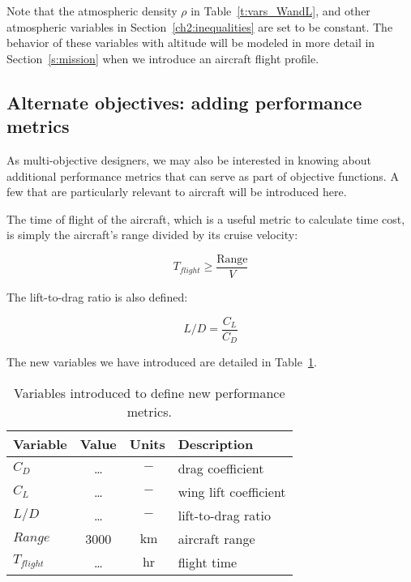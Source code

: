 Note that the atmospheric density $\rho$ in Table~\ref{t:vars_WandL}, and other
atmospheric variables in Section~\ref{ch2:inequalities} are set
to be constant. The behavior of these variables with altitude
will be modeled in more detail in Section~\ref{s:mission} when we
introduce an aircraft flight profile.

\subsection{Alternate objectives: adding performance metrics}
\label{s:altobj}

As multi-objective designers, we may also be interested in knowing about
additional performance metrics that can serve as part of objective functions. A
few that are particularly relevant to aircraft will be introduced here.

The time of flight of the aircraft, which is a useful metric to calculate
time cost, is simply the aircraft's range divided by its cruise velocity:

\begin{equation}
    T_{flight} \geq \frac{\mathrm{Range}}{V}
\end{equation}

The lift-to-drag ratio is also defined: 

\begin{equation}
    L/D = \frac{C_L}{C_D}    
\end{equation}

The new variables we have introduced are detailed in Table~\ref{t:vars_perfMetrics}.

\begin{footnotesize}
\begin{table}
    \centering
    \begin{tabular}{ l c c l}
        \toprule
        \textbf{Variable} & \textbf{Value} & \textbf{Units} & \textbf{Description} \\
        \midrule
        $C_D$ & \ldots & $~\mathrm{-}$ & drag coefficient \\
        $C_L$ & \ldots & $~\mathrm{-}$ & wing lift coefficient \\
        $L/D$ & \ldots & $~\mathrm{-}$ & lift-to-drag ratio \\
        $Range$ & 3000 & $~\mathrm{km}$ & aircraft range \\
        $T_{flight}$ & \ldots & $~\mathrm{hr}$ & flight time \\
        \bottomrule
    \end{tabular}
    \caption{Variables introduced to define new performance metrics.}
    \label{t:vars_perfMetrics}
\end{table} \end{footnotesize}

